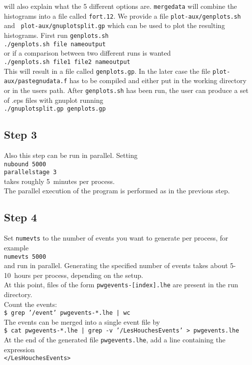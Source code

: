 \documentclass[a4paper,11pt]{article}
\begin{document}
will also explain what the 5 different options are. {\tt mergedata}
will combine the histograms into a file called {\tt fort.12}. We
provide a file {\tt plot-aux/genplots.sh} and {\tt
  plot-aux/gnuplotsplit.gp} which can be used to plot the resulting
histograms. First run {\tt genplots.sh}
\\[2ex]
{\tt ./genplots.sh file nameoutput}
\\[2ex]
or if a comparison between two different runs is wanted
\\[2ex]
{\tt ./genplots.sh file1 file2 nameoutput}
\\[2ex]
This will result in a file called {\tt genplots.gp}. In the later case
the file {\tt plot-aux/pastegnudata.f} has to be compiled and either put
in the working directory or in the users
path. After {\tt genplots.sh} has been run, the user can produce a set
of .eps files with gnuplot running
\\[2ex]
{\tt ./gnuplotsplit.gp genplots.gp}
\\[2ex]
\subsection*{Step 3}
%
Also this step can be run in parallel. 
Setting
\\[2ex]
{\tt nubound 5000}
\\
{\tt parallelstage  3}
\\[2ex]
takes roughly 5~minutes per process.
\\[2ex] 
The parallel execution of the program is
performed as in the previous step.

\subsection*{Step 4}
%
Set {\tt numevts} to the number of events you want to generate per
process, for example
\\[2ex]
{\tt numevts 5000}
\\[2ex]
and run in parallel. 
Generating the specified number of
events takes about 5-10~hours per process, depending on the setup.
\\[2ex]
At this point, files of the form {\tt pwgevents-[index].lhe} are
present in the run directory.
\\[2ex]
Count the events:
\\[2ex]
{\tt \$ grep '/event' pwgevents-*.lhe | wc}
\\[2ex]
The events can be merged into a single event file by
\\[2ex]
{\tt \$ cat pwgevents-*.lhe | grep -v '/LesHouchesEvents' >
  pwgevents.lhe}
\\[2ex]
At the end of the generated file {\tt pwgevents.lhe}, add a line containing the expression
\\[2ex]
{\tt </LesHouchesEvents>}
\end{document}

